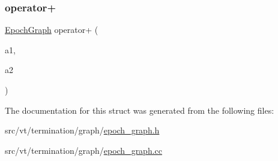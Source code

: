\subsubsection{\texorpdfstring{operator+}{operator+}}
{\footnotesize\ttfamily \hyperlink{structvt_1_1termination_1_1graph_1_1_epoch_graph}{Epoch\+Graph} operator+ (\begin{DoxyParamCaption}\item[{\hyperlink{structvt_1_1termination_1_1graph_1_1_epoch_graph}{Epoch\+Graph}}]{a1,  }\item[{\hyperlink{structvt_1_1termination_1_1graph_1_1_epoch_graph}{Epoch\+Graph} const \&}]{a2 }\end{DoxyParamCaption})\hspace{0.3cm}{\ttfamily [friend]}}



The documentation for this struct was generated from the following files\+:\begin{DoxyCompactItemize}
\item 
src/vt/termination/graph/\hyperlink{epoch__graph_8h}{epoch\+\_\+graph.\+h}\item 
src/vt/termination/graph/\hyperlink{epoch__graph_8cc}{epoch\+\_\+graph.\+cc}\end{DoxyCompactItemize}

